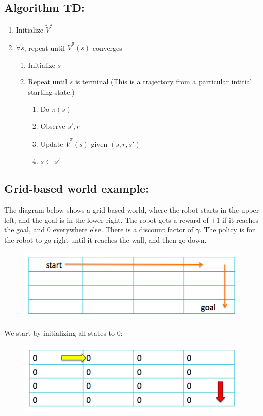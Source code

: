 \documentclass[11pt]{article}
\numberwithin{equation}{section}
\numberwithin{figure}{section}
\begin{document}
\subsection*{Algorithm TD:}

\begin{enumerate}
	\item Initialize $\tilde{V}^\pi$
	\item $\forall s$, repeat until $\tilde{V}^\pi(s)$ converges
	\begin{enumerate}
		\item Initialize $s$
		\item Repeat until $s$ is terminal (This is a trajectory from a particular intitial starting state.)
		\begin{enumerate}
			\item Do $\pi(s)$
			\item Observe $s', r$
			\item Update $\tilde{V}^\pi(s)$ given  $(s, r, s')$
			\label{step.updateTD}
			\item $s \leftarrow s'$
		\end{enumerate}		
	\end{enumerate}		
\end{enumerate}		

\subsection*{Grid-based world example:}
The diagram below shows a grid-based world, where the robot starts in the upper left, and the goal is in the lower right.  The robot gets a reward of $+1$ if it reaches the goal, and $0$ everywhere else.  There is a discount factor of $\gamma$.  The policy is for the robot to go right until it reaches the wall, and then go down.
\begin{figure}[h!]
	\centering
	\includegraphics[width=.4\columnwidth]{./images/fig1}
	\label{fig.fig1}
\end{figure}

We start by initializing all states to 0:

\begin{figure}[h!]
	\centering
	\includegraphics[width=.4\columnwidth]{./images/fig2}
	\label{fig.fig2}
\end{figure}
\end{document}
